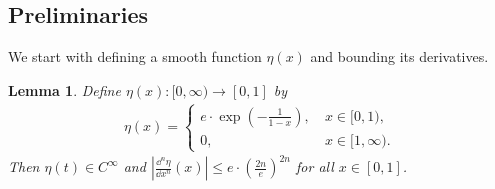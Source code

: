 \documentclass[12pt]{article}
\numberwithin{equation}{section}
\theoremstyle{theoremstyle}
\newtheorem{lemma}{Lemma}[section]
\numberwithin{equation}{section}
\numberwithin{theorem}{section}
\numberwithin{proposition}{section}
\numberwithin{definition}{section}
\numberwithin{lemma}{section}
\numberwithin{assumption}{section}
\numberwithin{remark}{section}
\begin{document}
\subsection{Preliminaries}\label{sec:bridge_preliminary}
We start with defining a smooth function $\eta(x)$ and bounding its derivatives.
\begin{lemma}
\label{lem:property_of_bump_function}
Define $\eta(x):[0,\infty)\to [0,1]$ by
\begin{align*}
\eta(x)=
\begin{cases}
    e\cdot\exp(-\frac{1}{1-x}),~ & x\in[0,1), \\
    0,                  ~ & x\in[1,\infty).
\end{cases}
\end{align*}
Then $\eta(t)\in C^\infty$ and $|\frac{\dd^n\eta}{\dd x^n}(x)|\leq e\cdot(\frac{2n}{e})^{2n}$ for all $x\in[0,1]$.
\end{lemma}
\end{document}
